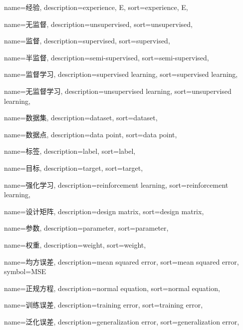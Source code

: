 {
  name=经验,
  description={experience, E},
  sort={experience, E},
}

{
  name=无监督,
  description={unsupervised},
  sort={unsupervised},
}

{
  name=监督,
  description={supervised},
  sort={supervised},
}

{
  name=半监督,
  description={semi-supervised},
  sort={semi-supervised},
}

{
  name=监督学习,
  description={supervised learning},
  sort={supervised learning},
}

{
  name=无监督学习,
  description={unsupervised learning},
  sort={unsupervised learning},
}

{
  name=数据集,
  description={dataset},
  sort={dataset},
}

{
   name=数据点,
   description={data point},
   sort={data point},
}

{
  name=标签,
  description={label},
  sort={label},
}

{
  name=目标,
  description={target},
  sort={target},
}

{
  name=强化学习,
  description={reinforcement learning},
  sort={reinforcement learning},
}

{
  name=设计矩阵,
  description={design matrix},
  sort={design matrix},
}

{
  name=参数,
  description={parameter},
  sort={parameter},
}

{
  name=权重,
  description={weight},
  sort={weight},
}

{
  name=均方误差,
  description={mean squared error},
  sort={mean squared error},
  symbol={MSE}
}

{
  name=正规方程,
  description={normal equation},
  sort={normal equation},
}

{
  name=训练误差,
  description={training error},
  sort={training error},
}

{
  name=泛化误差,
  description={generalization error},
  sort={generalization error},
}

